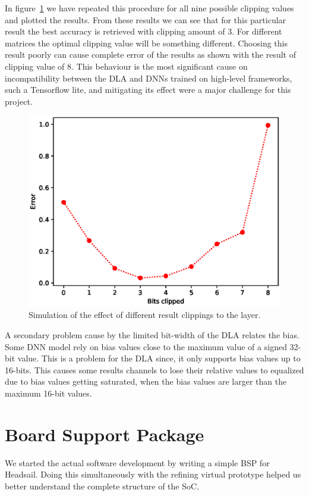 \documentclass[12pt,a4paper,english
]{tunithesis}
\begin{document}
In figure~\ref{fig:clipping} we have repeated this procedure for all nine possible clipping values and plotted the results. From these results we can see that for this particular result the best accuracy is retrieved with clipping amount of 3. For different matrices the optimal clipping value will be something different. Choosing this result poorly can cause complete error of the results as shown with the result of clipping value of 8.
This behaviour is the most significant cause on incompatibility between the DLA and DNNs trained on high-level frameworks, such a Tensorflow lite, and mitigating its effect were a major challenge for this project.

\begin{figure}
  \centering
  \includegraphics[width=0.85\linewidth]{img/clipping.eps}
  \caption{Simulation of the effect of different result clippings to the layer.}
  \label{fig:clipping}
\end{figure}

A secondary problem cause by the limited bit-width of the DLA relates the bias. Some DNN model rely on bias values close to the maximum value of a signed 32-bit value. This is a problem for the DLA since, it only supports bias values up to 16-bits. This causes some results channels to lose their relative values to equalized due to bias values getting saturated, when the bias values are larger than the maximum 16-bit values.

\section{Board Support Package}
\label{sec:software_support}
We started the actual software development by writing a simple BSP for Headsail. Doing this simultaneously with the refining virtual prototype helped us better understand the complete structure of the SoC.
\end{document}
